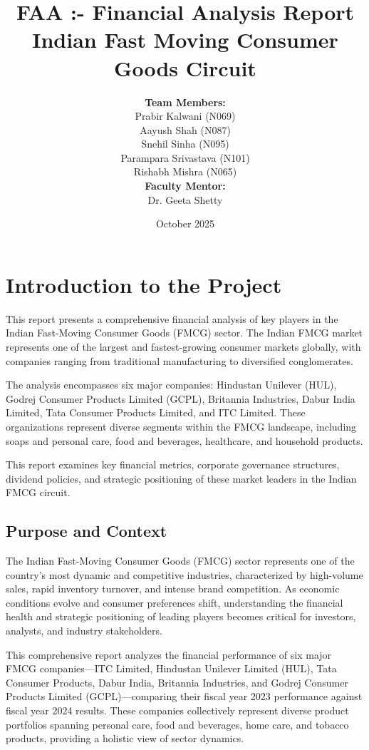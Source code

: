 \documentclass[12pt, a4paper]{report}
\title{\textbf{FAA :- Financial Analysis Report} \\ \vspace{0.5cm} \Large Indian Fast Moving Consumer Goods Circuit}
\author{
    \textbf{Team Members:} \\
    \vspace{0.3cm}
    Prabir Kalwani (N069) \\
    Aayush Shah (N087) \\
    Snehil Sinha (N095) \\
    Parampara Srivastava (N101) \\
    Rishabh Mishra (N065) \\
    \vspace{0.8cm}
    \textbf{Faculty Mentor:} \\
    Dr. Geeta Shetty
}
\date{October 2025}
\begin{document}
\maketitle

\newpage
\tableofcontents
\newpage

\chapter{Introduction to the Project}

This report presents a comprehensive financial analysis of key players in the Indian Fast-Moving Consumer Goods (FMCG) sector. The Indian FMCG market represents one of the largest and fastest-growing consumer markets globally, with companies ranging from traditional manufacturing to diversified conglomerates.

The analysis encompasses six major companies: Hindustan Unilever (HUL), Godrej Consumer Products Limited (GCPL), Britannia Industries, Dabur India Limited, Tata Consumer Products Limited, and ITC Limited. These organizations represent diverse segments within the FMCG landscape, including soaps and personal care, food and beverages, healthcare, and household products.

This report examines key financial metrics, corporate governance structures, dividend policies, and strategic positioning of these market leaders in the Indian FMCG circuit.

\section{Purpose and Context}

The Indian Fast-Moving Consumer Goods (FMCG) sector represents one of the country's most dynamic and competitive industries, characterized by high-volume sales, rapid inventory turnover, and intense brand competition. As economic conditions evolve and consumer preferences shift, understanding the financial health and strategic positioning of leading players becomes critical for investors, analysts, and industry stakeholders.

This comprehensive report analyzes the financial performance of six major FMCG companies---ITC Limited, Hindustan Unilever Limited (HUL), Tata Consumer Products, Dabur India, Britannia Industries, and Godrej Consumer Products Limited (GCPL)---comparing their fiscal year 2023 performance against fiscal year 2024 results. These companies collectively represent diverse product portfolios spanning personal care, food and beverages, home care, and tobacco products, providing a holistic view of sector dynamics.
\end{document}
